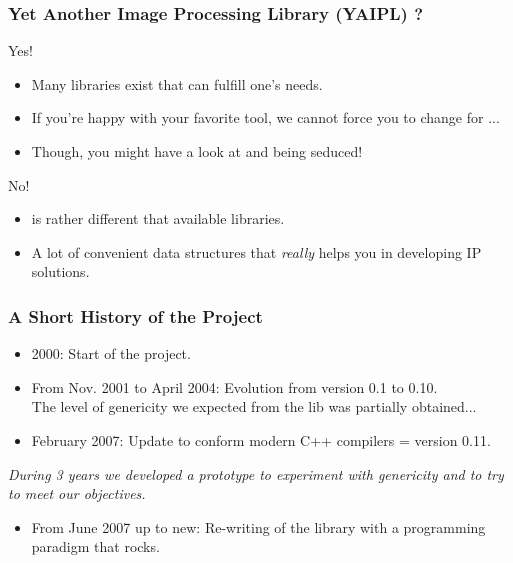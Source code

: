 \documentclass{beamer}
\begin{document}
\begin{frame}
  \frametitle{Yet Another Image Processing Library (YAIPL) ?}

  \begin{block}{Yes!}
    \begin{itemize}
    \item Many libraries exist that can fulfill one's needs.
    \item If you're happy with your favorite tool, we cannot force you
      to change for \mln...
    \item Though, you might have a look at \mln and being seduced!
    \end{itemize}
    
  \end{block}
 
  \bigskip

  \begin{block}{No!}
    \begin{itemize}
    \item \mln is rather different that available libraries.
    \item A lot of convenient data structures that \emph{really} helps
      you in developing IP solutions.
    \end{itemize}
  \end{block}

\end{frame}


\begin{frame}
  \frametitle{A Short History of the \oln Project}

  {\small
    
  \begin{itemize}
  \item 2000: Start of the project.
  \item From Nov. 2001 to April 2004: Evolution from version 0.1 to 0.10.\\
    The level of genericity we expected from the lib was partially obtained...
  \item February 2007: Update to conform modern C++ compilers = version 0.11.\\
  \end{itemize}

  \medskip

  \textit{During 3 years we developed a prototype to experiment with
    genericity and to try to meet our objectives.}

  \medskip

  \begin{itemize}
  \item From June 2007 up to new: Re-writing of the library with a
    programming paradigm that rocks.
  \end{itemize}

}%

\end{frame}
\end{document}
